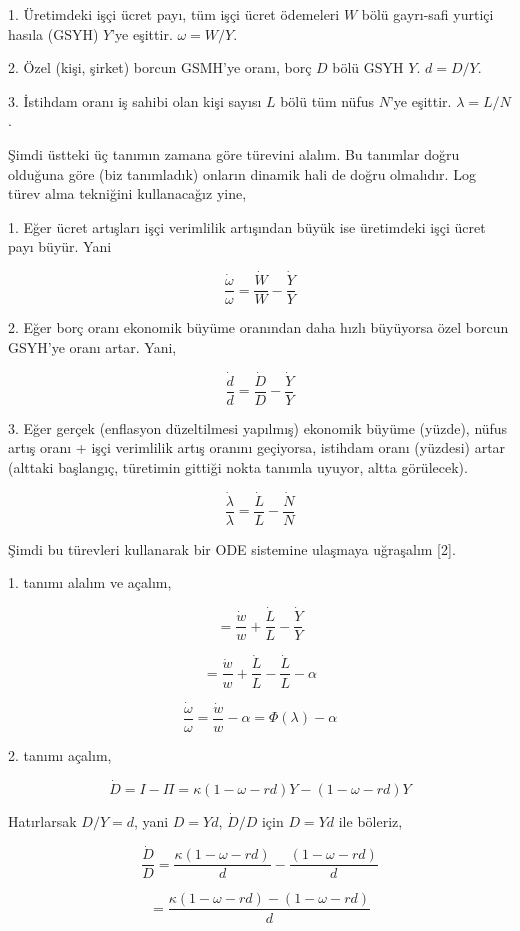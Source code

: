 \documentclass[12pt,fleqn]{article}\usepackage{../../common}
\begin{document}
1. Üretimdeki işçi ücret payı, tüm işçi ücret ödemeleri $W$ bölü gayrı-safi
yurtiçi hasıla (GSYH) $Y$'ye eşittir. $\omega = W/Y$.

2. Özel (kişi, şirket) borcun GSMH'ye oranı, borç $D$ bölü GSYH $Y$.  $d=D/Y$.

3. İstihdam oranı iş sahibi olan kişi sayısı $L$ bölü tüm nüfus $N$'ye
eşittir. $\lambda = L/N$.

Şimdi üstteki üç tanımın zamana göre türevini alalım. Bu tanımlar doğru
olduğuna göre (biz tanımladık) onların dinamik hali de doğru
olmalıdır. Log türev alma tekniğini kullanacağız yine, 

1. Eğer ücret artışları işçi verimlilik artışından büyük ise üretimdeki
işçi ücret payı büyür. Yani

$$ \frac{\dot{\omega}}{\omega} = \frac{\dot{W}}{W} - \frac{\dot{Y}}{Y} $$

2. Eğer borç oranı ekonomik büyüme oranından daha hızlı büyüyorsa özel
borcun GSYH'ye oranı artar. Yani,

$$ \frac{\dot{d}}{d} = \frac{\dot{D}}{D} - \frac{\dot{Y}}{Y} $$

3. Eğer gerçek (enflasyon düzeltilmesi yapılmış) ekonomik büyüme (yüzde),
nüfus artış oranı + işçi verimlilik artış oranını geçiyorsa, istihdam oranı
(yüzdesi) artar (alttaki başlangıç, türetimin gittiği nokta tanımla uyuyor,
altta görülecek).

$$ \frac{\dot{\lambda}}{\lambda} =  \frac{\dot{L}}{L} - \frac{\dot{N}}{N} $$

Şimdi bu türevleri kullanarak bir ODE sistemine ulaşmaya uğraşalım [2].

1. tanımı alalım ve açalım,

$$  = \frac{\dot{w}}{w} + \frac{\dot{L}}{L} - \frac{\dot{Y}}{Y} $$

$$  = \frac{\dot{w}}{w} + \frac{\dot{L}}{L} - \frac{\dot{L}}{L} - \alpha $$

$$ \frac{\dot{\omega}}{\omega} = \frac{\dot{w}}{w} - \alpha = \Phi(\lambda)-\alpha$$

2. tanımı açalım,

$$ \dot{D} = I - \Pi = \kappa(1 - \omega - rd) Y - (1-\omega-rd)Y $$

Hatırlarsak $D/Y = d$, yani $D = Yd$, $\dot{D}/D$ için $D=Yd$ ile böleriz,

$$ 
\frac{\dot{D}}{D} = \frac{ \kappa(1 - \omega - rd)}{d} 
- \frac{(1-\omega-rd)}{d}
$$

$$ 
= \frac{ \kappa(1 - \omega - rd) - (1-\omega-rd) }{d} 
$$
\end{document}
